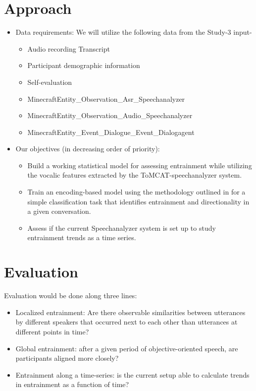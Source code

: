 \section{Approach}
\begin{itemize}
    \item Data requirements: We will utilize the following data from the Study-3 input-
        \begin{itemize}               
               \item Audio recording
                Transcript
               \item Participant demographic information
               \item Self-evaluation
               \item MinecraftEntity\_Observation\_Asr\_Speechanalyzer
               \item MinecraftEntity\_Observation\_Audio\_Speechanalyzer
               \item MinecraftEntity\_Event\_Dialogue\_Event\_Dialogagent
        \end{itemize}
    \item Our objectives (in decreasing order of priority):
    \begin{itemize} 
        \item Build a working statistical model for assessing entrainment while
            utilizing the vocalic features extracted by the ToMCAT-speechanalyzer
            system.         
        \item Train an encoding-based model using the methodology outlined in
            \textcite{nasir2020} for a simple classification task that identifies
            entrainment and directionality in a given conversation.
        \item Assess if the current Speechanalyzer system is set up to study
            entrainment trends as a time series. 
    \end{itemize} 
\end{itemize}

\section{Evaluation}

Evaluation would be done along three lines:

\begin{itemize}
    \item Localized entrainment: Are there observable similarities between
        utterances by different speakers that occurred next to each other than
        utterances at different points in time?
    \item Global entrainment: after a given period of objective-oriented
        speech, are participants aligned more closely? 
    \item Entrainment along a time-series: is the current setup able to
        calculate trends in entrainment as a function of time?
\end{itemize}

